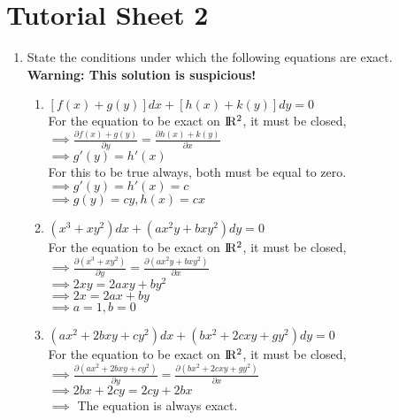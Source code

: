 \documentclass[a4paper]{article}
\begin{document}
\section{Tutorial Sheet 2}
\begin{enumerate}
\item{State the conditions under which the following equations are exact.
\textbf{\\Warning: This solution is suspicious!}
\begin{enumerate}
\item{$[f(x)+g(y)]dx+[h(x)+k(y)]dy=0$
\\For the equation to be exact on ${\rm I\!R^2}$, it must be closed,
\\$\implies \frac{\partial f(x)+g(y)}{\partial y} = \frac{\partial h(x)+k(y)}{\partial x}$
\\$\implies g'(y)=h'(x)$
\\For this to be true always, both must be equal to zero.
\\$\implies g'(y)=h'(x)=c$
\\$\implies g(y)=cy, h(x)=cx$
}

\item{$(x^3+xy^2)dx+(ax^2y+bxy^2)dy=0$
\\For the equation to be exact on ${\rm I\!R^2}$, it must be closed,
\\$\implies \frac{\partial (x^3+xy^2)}{\partial y}=\frac{\partial (ax^2y+bxy^2)}{\partial x}$
\\$\implies 2xy=2axy+by^2$
\\$\implies 2x=2ax+by$
\\$\implies a=1, b=0$
}

\item{$(ax^2+2bxy+cy^2)dx + (bx^2+2cxy+gy^2)dy=0$
\\For the equation to be exact on ${\rm I\!R^2}$, it must be closed,
\\$\implies \frac{\partial (ax^2+2bxy+cy^2)}{\partial y}=\frac{\partial (bx^2+2cxy+gy^2)}{\partial x}$
\\$\implies 2bx+2cy=2cy+2bx$
\\$\implies$ The equation is always exact.
}

\end{enumerate}
}


\end{enumerate}
\end{document}
